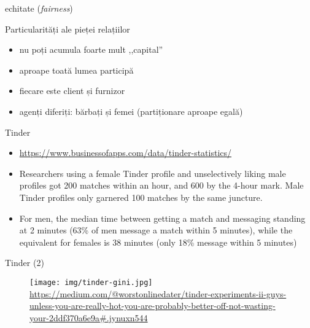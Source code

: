 \documentclass{simple}
\begin{document}
\begin{frame}{}
  \centering
  \pause
  \vspace{0.5cm}
  \Large{echitate (\textit{fairness})}
\end{frame}

\begin{frame}{Particularități ale pieței relațiilor}
  \begin{itemize}
    \pause
    \item nu poți acumula foarte mult ,,capital''
    \pause
    \item aproape toată lumea participă
    \pause
    \item fiecare este client și furnizor
    \pause
    \item agenți diferiți: bărbați și femei (partiționare aproape egală)
  \end{itemize}
\end{frame}

\begin{frame}{Tinder}
  \begin{itemize}
    \item \url{https://www.businessofapps.com/data/tinder-statistics/}
    \pause
    \item Researchers using a female Tinder profile and unselectively liking male profiles got 200 matches within an hour, and 600 by the 4-hour mark. Male Tinder profiles only garnered 100 matches by the same juncture.
    \pause
    \item For men, the median time between getting a match and messaging standing at 2 minutes (63\% of men message a match within 5 minutes), while the equivalent for females is 38 minutes (only 18\% message within 5 minutes)
  \end{itemize}
\end{frame}

\begin{frame}{Tinder (2)}
  \begin{figure}[!htbp]
    \centering
    \texttt{[image: img/tinder-gini.jpg]} \\
    \tiny{\url{https://medium.com/@worstonlinedater/tinder-experiments-ii-guys-unless-you-are-really-hot-you-are-probably-better-off-not-wasting-your-2ddf370a6e9a\#.jynuxn544}}
  \end{figure}
\end{frame}
\end{document}
